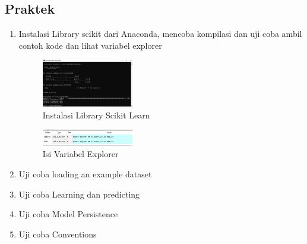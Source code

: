 \subsection{Praktek}
\begin{enumerate}
	\item Instalasi Library scikit dari Anaconda, mencoba kompilasi dan uji coba ambil contoh kode dan lihat variabel explorer
	\hfill\break
	\begin{figure}[H]
		\includegraphics[width=4cm]{figures/1174005/tugas1/materi/1.PNG}
		\centering
		\caption{Instalasi Library Scikit Learn}
	\end{figure}
	\begin{figure}[H]
		\includegraphics[width=4cm]{figures/1174005/tugas1/materi/2.PNG}
		\centering
		\caption{Isi Variabel Explorer}
	\end{figure}
	\item Uji coba loading an example dataset
	\hfill\break
	
	\item Uji coba Learning dan predicting
	\hfill\break
	
	\item Uji coba Model Persistence
	\hfill\break
	
	\item Uji coba Conventions
	\hfill\break
	
\end{enumerate}
